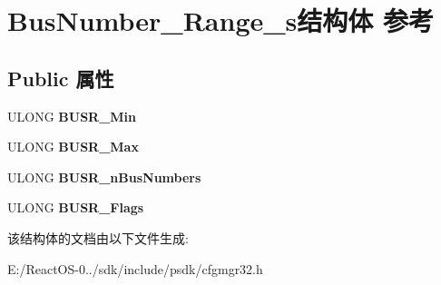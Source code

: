 \hypertarget{struct_bus_number___range__s}{}\section{Bus\+Number\+\_\+\+Range\+\_\+s结构体 参考}
\label{struct_bus_number___range__s}
\subsection*{Public 属性}
\begin{DoxyCompactItemize}
\item 
\mbox{\label{struct_bus_number___range__s_a6c31a350c7df2d9bf78ee15e6c887099}} 
U\+L\+O\+NG {\bfseries B\+U\+S\+R\+\_\+\+Min}
\item 
\mbox{\label{struct_bus_number___range__s_a11f91b6360c12ff5602a043062929cb6}} 
U\+L\+O\+NG {\bfseries B\+U\+S\+R\+\_\+\+Max}
\item 
\mbox{\label{struct_bus_number___range__s_aa5983c47e1fafa66ad24f7d81e86df0f}} 
U\+L\+O\+NG {\bfseries B\+U\+S\+R\+\_\+n\+Bus\+Numbers}
\item 
\mbox{\label{struct_bus_number___range__s_a0623a06be21a69879b0cab3f52e17352}} 
U\+L\+O\+NG {\bfseries B\+U\+S\+R\+\_\+\+Flags}
\end{DoxyCompactItemize}


该结构体的文档由以下文件生成\+:\begin{DoxyCompactItemize}
\item 
E\+:/\+React\+O\+S-\/0../sdk/include/psdk/cfgmgr32.\+h\end{DoxyCompactItemize}
